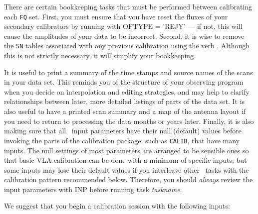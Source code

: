      There are certain bookkeeping tasks that must be performed
between calibrating each {\tt FQ} set.  First, you must ensure that
you have reset the fluxes of your secondary calibrators by running
{\tt {}} with {\us OPTYPE = 'REJY'} --- if not, this will
cause the amplitudes of your data to be incorrect.  Second, it is wise
to remove the {\tt SN} tables associated with any previous calibration
using the verb \hbox{{\tt {}}}.  Although this is not
strictly necessary, it will simplify your bookkeeping.


     It is useful to print a summary of the time stamps and source
names of the scans in your data set.  This reminds you of the
structure of your observing program when you decide on interpolation
and editing strategies, and may help to clarify relationships between
later, more detailed listings of parts of the data set.  It is also
useful to have a printed scan summary and a map of the antenna layout
if you need to return to processing the data months or years later.
Finally, it is also making sure that all \AIPS\ input parameters have
their null (default) values before invoking the parts of the
calibration package, such as {\tt CALIB}, that have many inputs.  The
null settings of most parameters are arranged to be sensible ones so
that basic VLA calibration can be done with a minimum of specific
inputs; but some inputs may lose their default values if you
interleave other \AIPS\ tasks with the calibration pattern recommended
below.  Therefore, you should {\it always\/} review the input
parameters with {\us INP \CR} before running task
{\it taskname\/}.

     We suggest that you begin a calibration session with the
following inputs:

